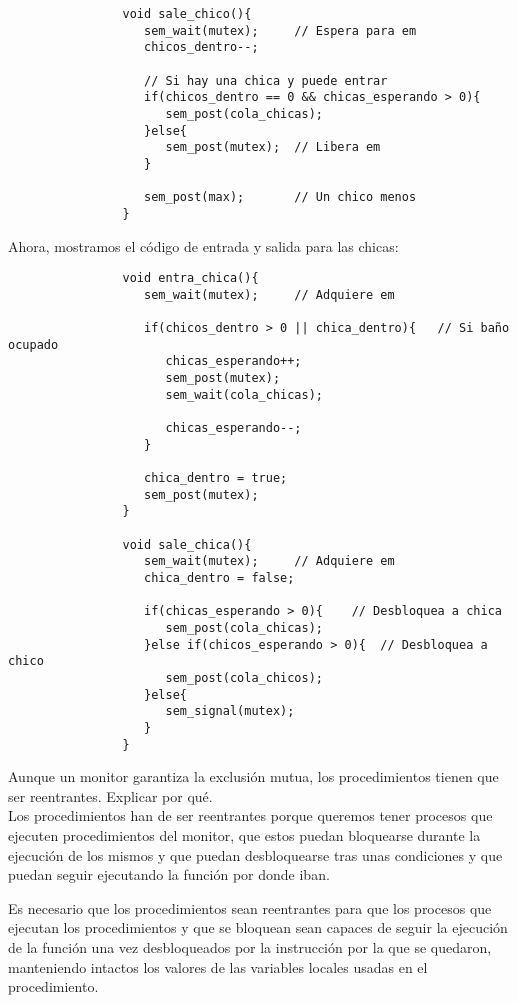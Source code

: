 \begin{ejercicio}
\begin{description}
\begin{verbatim}
                void sale_chico(){
                   sem_wait(mutex);     // Espera para em
                   chicos_dentro--;

                   // Si hay una chica y puede entrar
                   if(chicos_dentro == 0 && chicas_esperando > 0){
                      sem_post(cola_chicas);
                   }else{
                      sem_post(mutex);  // Libera em
                   }

                   sem_post(max);       // Un chico menos
                }
            \end{verbatim}
            Ahora, mostramos el código de entrada y salida para las chicas:
            \begin{verbatim}
                void entra_chica(){
                   sem_wait(mutex);     // Adquiere em

                   if(chicos_dentro > 0 || chica_dentro){   // Si baño ocupado
                      chicas_esperando++;
                      sem_post(mutex);
                      sem_wait(cola_chicas);

                      chicas_esperando--;
                   }

                   chica_dentro = true;
                   sem_post(mutex);
                }

                void sale_chica(){
                   sem_wait(mutex);     // Adquiere em
                   chica_dentro = false;

                   if(chicas_esperando > 0){    // Desbloquea a chica
                      sem_post(cola_chicas);
                   }else if(chicos_esperando > 0){  // Desbloquea a chico
                      sem_post(cola_chicos);
                   }else{
                      sem_signal(mutex);
                   }
                }
            \end{verbatim}
    \end{description}
\end{ejercicio}

\begin{ejercicio}
    Aunque un monitor garantiza la exclusión mutua, los procedimientos tienen que ser reentrantes. Explicar por qué.\\

    Los procedimientos han de ser reentrantes porque queremos tener procesos que ejecuten procedimientos del monitor, que estos puedan bloquearse durante la ejecución de los mismos y que puedan desbloquearse tras unas condiciones y que puedan seguir ejecutando la función por donde iban.

    Es necesario que los procedimientos sean reentrantes para que los procesos que ejecutan los procedimientos y que se bloquean sean capaces de seguir la ejecución de la función una vez desbloqueados por la instrucción por la que se quedaron, manteniendo intactos los valores de las variables locales usadas en el procedimiento.
\end{ejercicio}

